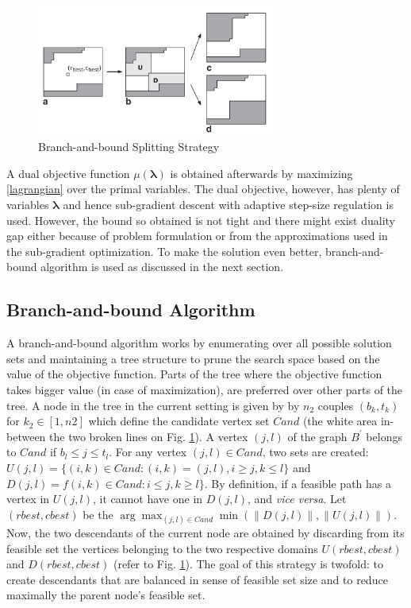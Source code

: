 \begin{figure}[htbp]
\centering
 \includegraphics[width=0.7\textwidth]{pic3}
 \caption{Branch-and-bound Splitting Strategy}
 \label{fig:BB}
\end{figure}

A dual objective function $\mu(\boldsymbol{\lambda})$ is obtained afterwards
by maximizing \ref{lagrangian} over the primal variables. The dual objective, however, has plenty of variables $\boldsymbol{\lambda}$ and hence sub-gradient descent \citep{hewc74,duhs11} with adaptive step-size regulation is used. However, the bound so obtained is not tight and there might exist duality gap either because of problem formulation or from the approximations used in the sub-gradient optimization. To make the solution even better, branch-and-bound algorithm is used as discussed in the next section.

\subsection{Branch-and-bound Algorithm}

A branch-and-bound algorithm works by enumerating over all possible solution sets and maintaining a tree structure to prune the search space based on the value of the objective function. Parts of the tree where the objective function takes bigger value (in case of maximization), are preferred over other parts of the tree.
A node in the tree in the current setting is given by by $n_2$ couples $(b_k, t_k)$ for $k_2 \in [1, n2]$ which define the candidate vertex set $Cand$ (the white area in-between the two broken lines on Fig. \ref{fig:BB}).
A vertex $(j, l)$ of the graph $B^{\prime}$ belongs to $Cand$ if $b_l\leq j \leq t_l$.
For any vertex $(j,l) \in Cand$, two sets are created:
$U(j,l)= \{(i, k) \in Cand : (i, k)=(j, l), i\ge j, k\le l\}$
and $D(j,l) = f(i, k) \in Cand : i\le j, k\ge l\}$.
By definition, if a feasible path has a vertex in $U(j,l)$, it cannot
have one in $D(j,l)$, and \emph{vice versa}.
Let $(rbest, cbest)$ be the $\arg\max_{(j, l)\in Cand} \min (\|D(j, l)\|, \|U(j, l)\|)$. Now, the two descendants of the current node are obtained by discarding from its feasible set the vertices belonging to the two respective domains $U(rbest,cbest)$ and $D(rbest, cbest)$ (refer to Fig. \ref{fig:BB}). The goal of this strategy is twofold: to create descendants that are balanced in sense of feasible set size and to reduce maximally the parent node’s feasible set. 